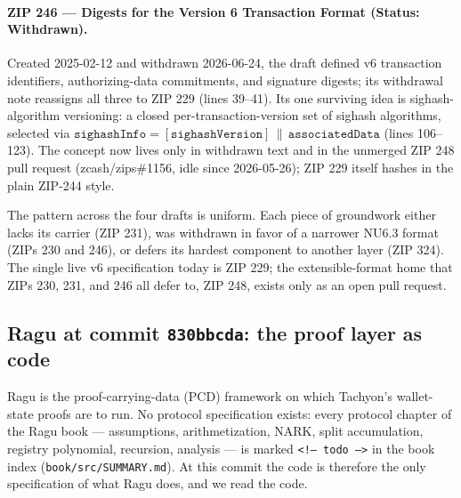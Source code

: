 \documentclass[11pt,a4paper]{article}
\theoremstyle{definition}
\begin{document}
\paragraph{ZIP 246 --- Digests for the Version 6 Transaction Format
(Status: Withdrawn).}
Created 2025-02-12 and withdrawn 2026-06-24, the draft defined v6
transaction identifiers, authorizing-data commitments, and signature
digests; its withdrawal note reassigns all three to ZIP 229 (lines 39--41).
Its one surviving idea is sighash-algorithm versioning: a closed
per-transaction-version set of sighash algorithms, selected via
$\mathtt{sighashInfo} = [\mathtt{sighashVersion}] \,\|\,
\mathtt{associatedData}$ (lines 106--123). The concept now lives only in
withdrawn text and in the unmerged ZIP 248 pull request (zcash/zips\#1156,
idle since 2026-05-26); ZIP 229 itself hashes in the plain ZIP-244 style.

\medskip
\noindent
The pattern across the four drafts is uniform. Each piece of groundwork
either lacks its carrier (ZIP 231), was withdrawn in favor of a narrower
NU6.3 format (ZIPs 230 and 246), or defers its hardest component to another
layer (ZIP 324). The single live v6 specification today is ZIP 229; the
extensible-format home that ZIPs 230, 231, and 246 all defer to, ZIP 248,
exists only as an open pull request.

\subsection{Ragu at commit \texttt{830bbcda}: the proof layer as code}
\label{sec:tachyon-ragu}

Ragu is the proof-carrying-data (PCD) framework on which Tachyon's
wallet-state proofs are to run. No protocol specification exists: every
protocol chapter of the Ragu book --- assumptions, arithmetization, NARK,
split accumulation, registry polynomial, recursion, analysis --- is marked
\texttt{<!-- todo -->} in the book index (\texttt{book/src/SUMMARY.md}).
At this commit the code is therefore the only specification of what Ragu
does, and we read the code.
\end{document}
